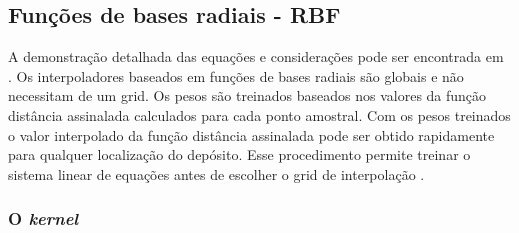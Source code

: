 \begin{table}[]
\centering
{}
\caption{\textit{Benchmark} dos diferentes métodos de interpolação.} \label{bench}
\end{table}

\subsection{Funções de bases radiais - RBF}

A demonstração detalhada das equações e considerações  pode ser encontrada em . Os interpoladores baseados em funções de bases radiais são globais e não necessitam de um grid. Os pesos são treinados baseados nos valores da função distância assinalada calculados para cada ponto amostral. Com os pesos treinados o valor interpolado da função distância assinalada pode ser obtido rapidamente para qualquer localização do depósito. Esse procedimento permite treinar o sistema linear de equações antes de escolher o grid de interpolação \cite{martin2017implicitmodeling}.

\subsubsection{O \textit{kernel}}

